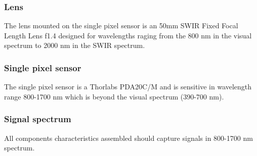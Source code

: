 \subsubsection{Lens}
The lens mounted on the single pixel sensor is an 50mm SWIR Fixed Focal Length Lens f1.4 designed for wavelengths raging from the 800 nm in the visual spectrum to 2000 nm in the SWIR spectrum. \cite{website:SWIR_objective}

\subsubsection{Single pixel sensor}
The single pixel sensor is a Thorlabs PDA20C/M and is sensitive in wavelength range 800-1700 nm which is beyond the visual spectrum (390-700 nm). \cite{manual:PDA}

\subsubsection{Signal spectrum}
All components characteristics assembled should capture signals in 800-1700 nm spectrum.











